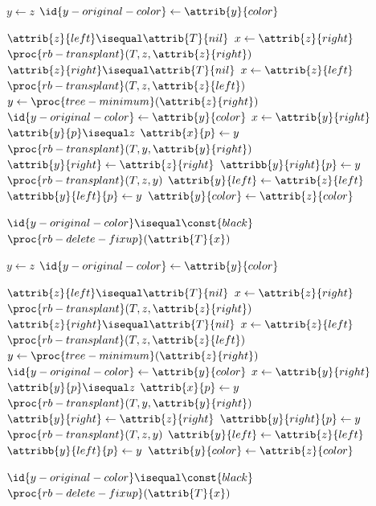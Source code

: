 \documentclass[UTF8,11pt,openany]{ctexbook}
\begin{document}
\begin{codebox}
	\li    $y \gets z$
	\li    $\id{y-original-color} \gets \attrib{y}{color}$
	
	\li    \If $ \attrib{z}{left} \isequal \attrib{T}{nil} $
	\li        \Then  $ x  \gets \attrib{z}{right}$
	\li               $ \proc{rb-transplant}(T,z,\attrib{z}{right}) $
	\li    \ElseIf    $\attrib{z}{right} \isequal \attrib{T}{nil} $
	\li        \Then  $ x  \gets \attrib{z}{left} $
	\li               $ \proc{rb-transplant}(T,z,\attrib{z}{left}) $
	\li    \Else  $ y \gets \proc{tree-minimum}(\attrib{z}{right}) $
	\li           $ \id{y-original-color} \gets \attrib{y}{color} $  			  
	\li           $ x \gets \attrib{y}{right} $       
	\li           \If $ \attrib{y}{p} \isequal  z $		
	\li             \Then $ \attrib{x}{p}\gets y $
	\li           \Else  $ \proc{rb-transplant}(T,y,\attrib{y}{right}) $ 
	\li                  $ \attrib{y}{right} \gets \attrib{z}{right} $
	\li                  $ \attribb{y}{right}{p} \gets y $ 
	\End
	\li           $ \proc{rb-transplant}(T,z,y) $ 
	\li           $ \attrib{y}{left} \gets \attrib{z}{left} $ 
	\li           $ \attribb{y}{left}{p} \gets y $ 
	\li           $ \attrib{y}{color} \gets \attrib{z}{color} $ 
	\End
	
	\li    \If $ \id{y-original-color} \isequal \const{black} $
	\li       \Then $\proc{rb-delete-fixup}(\attrib{T}{x})$
	\End
\end{codebox}

\newpage
\onecolumn

\begin{codebox}
	\li    $y \gets z$
	\li    $\id{y-original-color} \gets \attrib{y}{color}$
	
	\li    \If $ \attrib{z}{left} \isequal \attrib{T}{nil} $
	\li        \Then  $ x  \gets \attrib{z}{right}$
	\li               $ \proc{rb-transplant}(T,z,\attrib{z}{right}) $
	\li    \ElseIf    $\attrib{z}{right} \isequal \attrib{T}{nil} $
	\li        \Then  $ x  \gets \attrib{z}{left} $
	\li               $ \proc{rb-transplant}(T,z,\attrib{z}{left}) $
	\li    \Else  $ y \gets \proc{tree-minimum}(\attrib{z}{right}) $
	\li           $ \id{y-original-color} \gets \attrib{y}{color} $  			  
	\li           $ x \gets \attrib{y}{right} $       
	\li           \If $ \attrib{y}{p} \isequal  z $		
	\li             \Then $ \attrib{x}{p}\gets y $
	\li           \Else  $ \proc{rb-transplant}(T,y,\attrib{y}{right}) $ 
	\li                  $ \attrib{y}{right} \gets \attrib{z}{right} $
	\li                  $ \attribb{y}{right}{p} \gets y $ 
	\End
	\li           $ \proc{rb-transplant}(T,z,y) $ 
	\li           $ \attrib{y}{left} \gets \attrib{z}{left} $ 
	\li           $ \attribb{y}{left}{p} \gets y $ 
	\li           $ \attrib{y}{color} \gets \attrib{z}{color} $ 
	\End
	
	\li    \If $ \id{y-original-color} \isequal \const{black} $
	\li       \Then $\proc{rb-delete-fixup}(\attrib{T}{x})$
	\End
\end{codebox}
\end{document}
